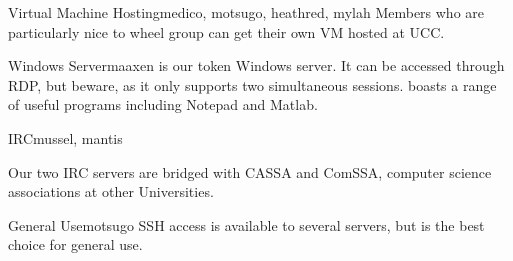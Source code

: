 \begin{uccservice}{Virtual Machine Hosting}{medico, motsugo, heathred, mylah}
Members who are particularly nice to wheel group can get their own VM hosted at UCC. %

\end{uccservice}



\begin{uccservice}{Windows Server}{maaxen}
 is our token Windows server. It can be accessed through RDP, but beware, as it only supports two simultaneous sessions.  boasts a range of useful programs including Notepad and Matlab.
\end{uccservice}

\begin{uccservice}{IRC}{mussel, mantis}

Our two IRC servers are bridged with CASSA and ComSSA, computer science associations at other Universities.
\end{uccservice}

\begin{uccservice}{General Use}{motsugo}
SSH access is available to several servers, but  is the best choice for general use. %
\end{uccservice}


